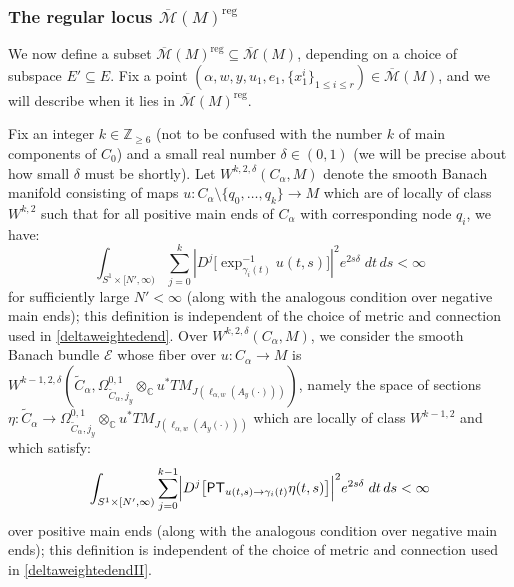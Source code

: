 \documentclass[12pt]{article}
\theoremstyle{definition}
\theoremstyle{remark}
\numberwithin{equation}{subsection}
\newcommand{\E}{\mathcal E}
\newcommand{\CC}{\mathbb C}
\newcommand{\ZZ}{\mathbb Z}
\newcommand{\PT}{\mathsf{PT}}
\newcommand{\Mbar}{\overline{\mathcal M}}
\newcommand{\reg}{\mathrm{reg}}
\begin{document}
\subsubsection{The regular locus $\Mbar(M)^\reg$}\label{regularlocusdef}

We now define a subset $\Mbar(M)^\reg\subseteq\Mbar(M)$, depending on a choice of subspace $E'\subseteq E$.  Fix a point $(\alpha,w,y,u_1,e_1,\{x^i_1\}_{1\leq i\leq r})\in\Mbar(M)$, and we will describe when it lies in $\Mbar(M)^\reg$.

Fix an integer $k\in\ZZ_{\geq 6}$ (not to be confused with the number $k$ of main components of $C_0$) and a small real number $\delta\in(0,1)$ (we will be precise about how small $\delta$ must be shortly).  Let $W^{k,2,\delta}(C_\alpha,M)$ denote the smooth Banach manifold consisting of maps $u:C_\alpha\setminus\{q_0,\ldots,q_k\}\to M$ which are of locally of class $W^{k,2}$ such that for all positive main ends of $C_\alpha$ with corresponding node $q_i$, we have:
\begin{equation}\label{deltaweightedend}
\int_{S^1\times[N',\infty)}\sum_{j=0}^k\left|D^j\bigl[\exp^{-1}_{\gamma_i(t)}u(t,s)\bigr]\right|^2e^{2s\delta}\;dt\,ds<\infty
\end{equation}
for sufficiently large $N'<\infty$ (along with the analogous condition over negative main ends); this definition is independent of the choice of metric and connection used in \eqref{deltaweightedend}.  Over $W^{k,2,\delta}(C_\alpha,M)$, we consider the smooth Banach bundle $\E$ whose fiber over $u:C_\alpha\to M$ is $W^{k-1,2,\delta}(\tilde C_\alpha,\Omega^{0,1}_{\tilde C_\alpha,j_y}\otimes_\CC u^\ast TM_{J(\ell_{\alpha,w}(A_y(\cdot)))})$, namely the space of sections $\eta:\tilde C_\alpha\to\Omega^{0,1}_{\tilde C_\alpha,j_y}\otimes_\CC u^\ast TM_{J(\ell_{\alpha,w}(A_y(\cdot)))}$ which are locally of class $W^{k-1,2}$ and which satisfy:
\begin{equation}\label{deltaweightedendII}
\int_{S^1\times[N',\infty)}\sum_{j=0}^{k-1}\Bigl|D^j\bigl[\PT_{u(t,s)\to\gamma_i(t)}\eta(t,s)\bigr]\Bigr|^2e^{2s\delta}\;dt\,ds<\infty
\end{equation}
over positive main ends (along with the analogous condition over negative main ends); this definition is independent of the choice of metric and connection used in \eqref{deltaweightedendII}.
\end{document}
